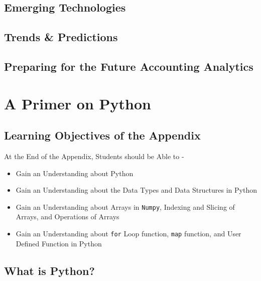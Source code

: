 \documentclass[
  letterpaper,
  DIV=11,
  numbers=noendperiod]{scrreprt}
\begin{document}
\section{Emerging Technologies}\label{emerging-technologies}

\section{Trends \& Predictions}\label{trends-predictions}

\section{Preparing for the Future Accounting
Analytics}\label{preparing-for-the-future-accounting-analytics}

\cleardoublepage
{}
{}
\appendix

\chapter{A Primer on Python}\label{a-primer-on-python}

\section*{Learning Objectives of the
Appendix}\label{learning-objectives-of-the-appendix}


At the End of the Appendix, Students should be Able to -

\begin{itemize}
\item
  Gain an Understanding about Python
\item
  Gain an Understanding about the Data Types and Data Structures in
  Python
\item
  Gain an Understanding about Arrays in \texttt{Numpy}, Indexing and
  Slicing of Arrays, and Operations of Arrays
\item
  Gain an Understanding about \texttt{for} Loop function, \texttt{map}
  function, and User Defined Function in Python
\end{itemize}

\section{What is Python?}\label{what-is-python}
\end{document}
